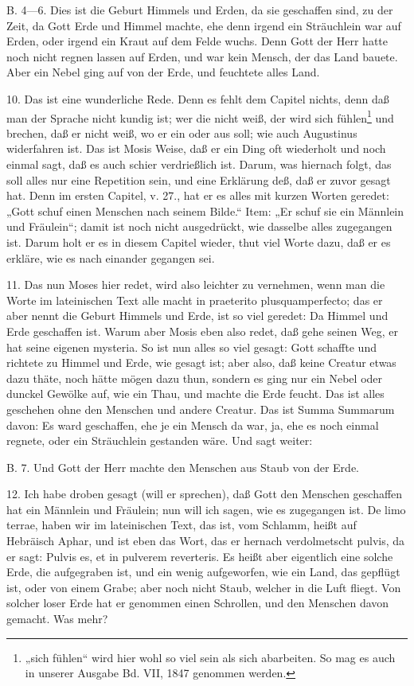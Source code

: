 B. 4—6. Dies ist die Geburt Himmels und Erden, da sie geschaffen sind, zu der Zeit, da Gott Erde und Himmel machte, ehe denn irgend ein Sträuchlein war auf Erden, oder irgend ein Kraut auf dem Felde wuchs. Denn Gott der Herr hatte noch nicht regnen lassen auf Erden, und war kein Mensch, der das Land bauete. Aber ein Nebel ging auf von der Erde, und feuchtete alles Land.

10. Das ist eine wunderliche Rede. Denn es fehlt dem Capitel nichts, denn daß man der Sprache nicht kundig ist; wer die nicht weiß, der wird sich fühlen\footnote{„sich fühlen“ wird hier wohl so viel sein als sich abarbeiten. So mag es auch in unserer Ausgabe Bd. VII, 1847 genommen werden.} und brechen, daß er nicht weiß, wo er ein oder aus soll; wie auch Augustinus widerfahren ist. Das ist Mosis Weise, daß er ein Ding oft wiederholt und noch einmal sagt, daß es auch schier verdrießlich ist. Darum, was hiernach folgt, das soll alles nur eine Repetition sein, und eine Erklärung deß, daß er zuvor gesagt hat. Denn im ersten Capitel, v. 27., hat er es alles mit kurzen Worten geredet: „Gott schuf einen Menschen nach seinem Bilde.“ Item: „Er schuf sie ein Männlein und Fräulein“; damit ist noch nicht ausgedrückt, wie dasselbe alles zugegangen ist. Darum holt er es in diesem Capitel wieder, thut viel Worte dazu, daß er es erkläre, wie es nach einander gegangen sei.

11. Das nun Moses hier redet, wird also leichter zu vernehmen, wenn man die Worte im lateinischen Text alle macht in praeterito plusquamperfecto; das er aber nennt die Geburt Himmels und Erde, ist so viel geredet: Da Himmel und Erde geschaffen ist. Warum aber Mosis eben also redet, daß gehe seinen Weg, er hat seine eigenen mysteria. So ist nun alles so viel gesagt: Gott schaffte und richtete zu Himmel und Erde, wie gesagt ist; aber also, daß keine Creatur etwas dazu thäte, noch hätte mögen dazu thun, sondern es ging nur ein Nebel oder dunckel Gewölke auf, wie ein Thau, und machte die Erde feucht. Das ist alles geschehen ohne den Menschen und andere Creatur. Das ist Summa Summarum davon: Es ward geschaffen, ehe je ein Mensch da war, ja, ehe es noch einmal regnete, oder ein Sträuchlein gestanden wäre. Und sagt weiter:

B. 7. Und Gott der Herr machte den Menschen aus Staub von der Erde.

12. Ich habe droben gesagt (will er sprechen), daß Gott den Menschen geschaffen hat ein Männlein und Fräulein; nun will ich sagen, wie es zugegangen ist. De limo terrae, haben wir im lateinischen Text, das ist, vom Schlamm, heißt auf Hebräisch Aphar, und ist eben das Wort, das er hernach verdolmetscht pulvis, da er sagt: Pulvis es, et in pulverem reverteris. Es heißt aber eigentlich eine solche Erde, die aufgegraben ist, und ein wenig aufgeworfen, wie ein Land, das gepflügt ist, oder von einem Grabe; aber noch nicht Staub, welcher in die Luft fliegt. Von solcher loser Erde hat er genommen einen Schrollen, und den Menschen davon gemacht. Was mehr?

